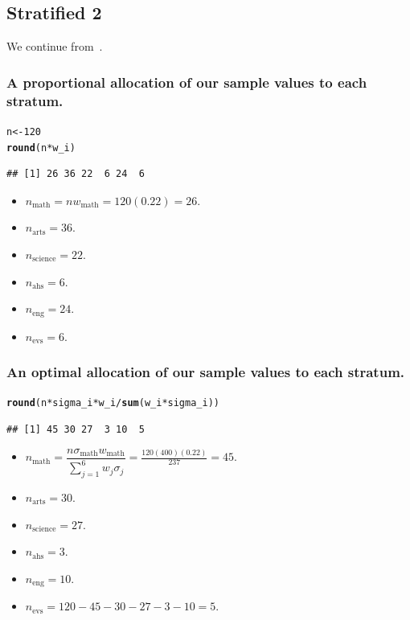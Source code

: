 \documentclass[oneside]{book}\usepackage[]{graphicx}\usepackage[dvipsnames,table,xcdraw]{xcolor}
\makeatletter
\newcommand{\hlnum}[1]{\textcolor[rgb]{0.686,0.059,0.569}{#1}}%
\newcommand{\hlopt}[1]{\textcolor[rgb]{0,0,0}{#1}}%
\newcommand{\hlstd}[1]{\textcolor[rgb]{0.345,0.345,0.345}{#1}}%
\newcommand{\hlkwb}[1]{\textcolor[rgb]{0.69,0.353,0.396}{#1}}%
\newcommand{\hlkwd}[1]{\textcolor[rgb]{0.737,0.353,0.396}{\textbf{#1}}}%
\newenvironment{kframe}{%
 \def\at@end@of@kframe{}%
 \ifinner\ifhmode%
  \def\at@end@of@kframe{\end{minipage}}%
  \begin{minipage}{\columnwidth}%
 \fi\fi%
 \def\FrameCommand##1{\hskip\@totalleftmargin \hskip-\fboxsep
 \colorbox{shadecolor}{##1}\hskip-\fboxsep
     \hskip-\linewidth \hskip-\@totalleftmargin \hskip\columnwidth}%
 \MakeFramed {\advance\hsize-\width
   \@totalleftmargin\z@ \linewidth\hsize
   \@setminipage}}%
 {\par\unskip\endMakeFramed%
 \at@end@of@kframe}
\newenvironment{knitrout}{}{} %
\makeatother
\begin{document}
\subsection{Stratified 2}
We continue from~.
\subsubsection*{A proportional allocation of our sample values to each stratum.}
\begin{knitrout}
\color{fgcolor}\begin{kframe}
\begin{alltt}
\hlstd{n} \hlkwb{<-} \hlnum{120}
\hlkwd{round}\hlstd{(n} \hlopt{*} \hlstd{w_i)}
\end{alltt}
\begin{verbatim}
## [1] 26 36 22  6 24  6
\end{verbatim}
\end{kframe}
\end{knitrout}
\begin{itemize}
    \item $n_\text{math}=n w_\text{math}=120(0.22)=26$.
    \item $n_\text{arts}=36$.
    \item $n_\text{science}=22$.
    \item $n_{\text{ahs}}=6$.
    \item $n_{\text{eng}}=24$.
    \item $n_{\text{evs}}=6$.
\end{itemize}

\subsubsection*{An optimal allocation of our sample values to each stratum.}
\begin{knitrout}
\color{fgcolor}\begin{kframe}
\begin{alltt}
\hlkwd{round}\hlstd{(n} \hlopt{*} \hlstd{sigma_i} \hlopt{*} \hlstd{w_i}\hlopt{/}\hlkwd{sum}\hlstd{(w_i} \hlopt{*} \hlstd{sigma_i))}
\end{alltt}
\begin{verbatim}
## [1] 45 30 27  3 10  5
\end{verbatim}
\end{kframe}
\end{knitrout}
\begin{itemize}
    \item $n_\text{math}=\dfrac{n\sigma_\text{math}w_\text{math}}{\sum_{j=1}^{6} w_j \sigma_j}=\frac{120(400)(0.22)}{237}=45$.
    \item $n_\text{arts}=30$.
    \item $n_\text{science}=27$.
    \item $n_{\text{ahs}}=3$.
    \item $n_{\text{eng}}=10$.
    \item $n_{\text{evs}}=120-45-30-27-3-10=5$.
\end{itemize}
\end{document}
